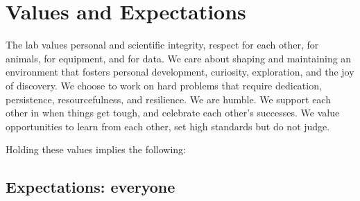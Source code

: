\documentclass{tufte-book}
\begin{document}

\chapter{Values and Expectations}\label{ch:expectations}

The lab values personal and scientific integrity, respect for each
other, for animals, for equipment, and for data. We care about shaping
and maintaining an environment that fosters personal development,
curiosity, exploration, and the joy of discovery. We choose to work on
hard problems that require dedication, persistence, resourcefulness,
and resilience. We are humble. We support each other in when things
get tough, and celebrate each other's successes. We value
opportunities to learn from each other, set high standards but do not
judge.

Holding these values implies the following:

\section{Expectations: everyone}
\end{document}
